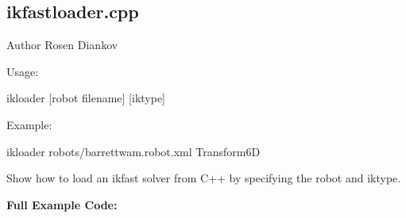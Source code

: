 \hypertarget{ikfastloader.cpp-example}{
\subsection{ikfastloader.cpp}
}
\begin{DoxyAuthor}{Author}
Rosen Diankov
\end{DoxyAuthor}
Usage: \begin{DoxyVerb}
    ikloader [robot filename] [iktype]
    \end{DoxyVerb}


Example: \begin{DoxyVerb}
    ikloader robots/barrettwam.robot.xml Transform6D
    \end{DoxyVerb}


Show how to load an ikfast solver from C++ by specifying the robot and iktype.

{\bfseries Full Example Code:}


